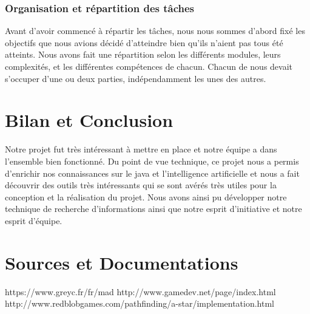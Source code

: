 \documentclass[a4paper,12pt]{article} %
\begin{document}
\subsubsection{Organisation et répartition des tâches}
Avant d’avoir commencé à répartir les tâches, nous  nous sommes d’abord fixé les objectifs que nous avions décidé d'atteindre bien qu’ils n'aient pas tous été atteints.
\newline\newline  
Nous avons fait une répartition selon les différents modules, leurs complexités, et les différentes compétences de chacun.
\newline\newline  
Chacun de nous devait s’occuper d’une ou deux parties, indépendamment les unes des autres.
\newpage
\section{Bilan et Conclusion}
Notre projet fut très intéressant à mettre en place et notre équipe a dans l'ensemble bien fonctionné.
\newline\newline
Du point de vue technique, ce projet nous a permis d'enrichir nos connaissances sur le java et l'intelligence artificielle et nous a fait découvrir des outils très intéressants  qui se sont avérés très utiles pour la conception et la réalisation du projet.
\newline\newline
Nous avons ainsi pu développer notre technique de recherche d'informations ainsi que notre esprit d'initiative et notre esprit d'équipe.
\newpage
\section{Sources et Documentations}
\noindent
\newline\newline
https://www.greyc.fr/fr/mad 
\newline\newline
http://www.gamedev.net/page/index.html
\newline\newline
http://www.redblobgames.com/pathfinding/a-star/implementation.html
\end{document}
